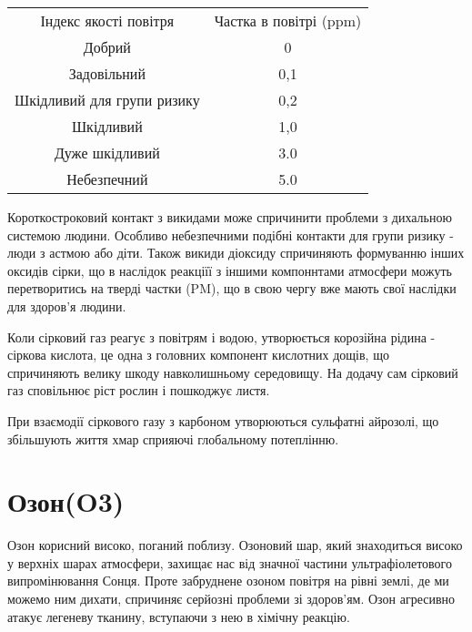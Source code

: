 \begin{center}
    \begin{tabular}{c c}
        Індекс якості повітря & 
        Частка в повітрі (ppm) \\
        \cellcolor{green}
        Добрий &  0 \\
        \cellcolor{yellow}
        Задовільний & 0,1\\
        \cellcolor{orange}
        Шкідливий для групи ризику & 0,2\\
        \cellcolor{red}
        Шкідливий & 1,0 \\
        \cellcolor{Mahogany}
        Дуже шкідливий & 3.0\\
        \cellcolor{Sepia}
        Небезпечний & 5.0 \\
    \end{tabular}
    
    \vspace{1cm}
\end{center}



Короткостроковий контакт з викидами може спричинити проблеми з дихальною 
системою людини. Особливо небезпечними подібні контакти для групи ризику - 
люди з астмою або діти. Також викиди діоксиду спричиняють формуванню інших 
оксидів сірки, що в наслідок реакціїї з іншими компоннтами атмосфери можуть 
перетворитись на тверді частки (PM), що в свою чергу вже мають свої 
наслідки для здоров'я людини.\cite{noauthor_sulphur_nodate}


Коли сірковий газ реагує з повітрям і водою, утворюється корозійна рідина - 
сіркова кислота, це одна з головних компонент кислотних дощів, що 
спричиняють велику шкоду навколишньому середовищу. На додачу сам сірковий 
газ сповільнює ріст рослин і пошкоджує листя. 


При взаємодії сіркового газу з карбоном утворюються сульфатні айрозолі, що 
збільшують життя хмар сприяючі глобальному потеплінню.


\section{Озон(O3)}

Озон корисний високо, поганий поблизу. Озоновий шар, який знаходиться високо у верхніх шарах атмосфери, захищає нас від значної частини ультрафіолетового випромінювання Сонця. Проте забруднене озоном повітря на рівні землі, де ми можемо ним дихати, спричиняє серйозні проблеми зі здоров’ям. Озон агресивно атакує легеневу тканину, вступаючи з нею в хімічну реакцію. \cite{noauthor__nodate-1}

